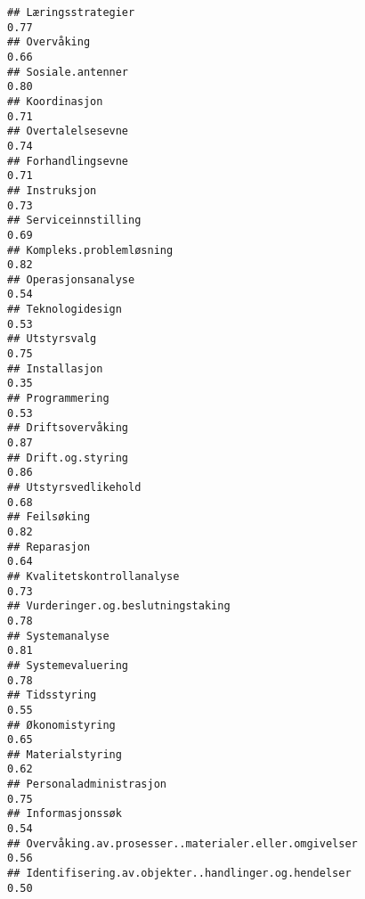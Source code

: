 \documentclass[
]{article}
\begin{document}
\begin{verbatim}
## Læringsstrategier                                                                0.77
## Overvåking                                                                       0.66
## Sosiale.antenner                                                                 0.80
## Koordinasjon                                                                     0.71
## Overtalelsesevne                                                                 0.74
## Forhandlingsevne                                                                 0.71
## Instruksjon                                                                      0.73
## Serviceinnstilling                                                               0.69
## Kompleks.problemløsning                                                          0.82
## Operasjonsanalyse                                                                0.54
## Teknologidesign                                                                  0.53
## Utstyrsvalg                                                                      0.75
## Installasjon                                                                     0.35
## Programmering                                                                    0.53
## Driftsovervåking                                                                 0.87
## Drift.og.styring                                                                 0.86
## Utstyrsvedlikehold                                                               0.68
## Feilsøking                                                                       0.82
## Reparasjon                                                                       0.64
## Kvalitetskontrollanalyse                                                         0.73
## Vurderinger.og.beslutningstaking                                                 0.78
## Systemanalyse                                                                    0.81
## Systemevaluering                                                                 0.78
## Tidsstyring                                                                      0.55
## Økonomistyring                                                                   0.65
## Materialstyring                                                                  0.62
## Personaladministrasjon                                                           0.75
## Informasjonssøk                                                                  0.54
## Overvåking.av.prosesser..materialer.eller.omgivelser                             0.56
## Identifisering.av.objekter..handlinger.og.hendelser                              0.50

\end{verbatim}
\end{document}
